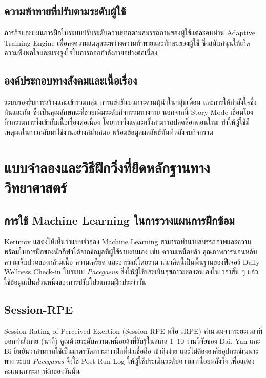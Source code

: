 \subsection{ความท้าทายที่ปรับตามระดับผู้ใช้}

ภารกิจและแผนการฝึกในระบบปรับระดับความยากตามสมรรถภาพของผู้ใช้แต่ละคนผ่าน Adaptive Training Engine เพื่อคงความสมดุลระหว่างความท้าทายและทักษะของผู้ใช้ ซึ่งสนับสนุนให้เกิดความพึงพอใจและแรงจูงใจในการออกกำลังกายอย่างต่อเนื่อง

\subsection{องค์ประกอบทางสังคมและเนื้อเรื่อง}

ระบบรองรับการสร้างและเข้าร่วมกลุ่ม การแข่งขันบนกระดานผู้นำในกลุ่มเพื่อน และการให้กำลังใจซึ่งกันและกัน ซึ่งเป็นคุณลักษณะที่ช่วยเพิ่มระดับกิจกรรมทางกาย \cite{tong2018} นอกจากนี้ Story Mode เชื่อมโยงกิจกรรมการวิ่งเข้ากับเนื้อเรื่องต่อเนื่อง โดยการวิ่งแต่ละครั้งสามารถปลดล็อกตอนใหม่ ทำให้ผู้ใช้มีเหตุผลในการกลับมาใช้งานอย่างสม่ำเสมอ พร้อมข้อมูลผลลัพธ์ทันทีหลังจบกิจกรรม

\section{แบบจำลองและวิธีฝึกวิ่งที่ยึดหลักฐานทางวิทยาศาสตร์}

\subsection{การใช้ Machine Learning ในการวางแผนการฝึกซ้อม}

Kerimov \cite{kerimov2025} แสดงให้เห็นว่าแบบจำลอง Machine Learning สามารถทำนายสมรรถภาพและความพร้อมในการฝึกของนักกีฬาได้จากข้อมูลที่ผู้ใช้รายงานเอง เช่น ความเหนื่อยล้า คุณภาพการนอนหลับ ความเจ็บปวดของกล้ามเนื้อ ความเครียด และอารมณ์โดยรวม แนวคิดนี้เป็นพื้นฐานของฟีเจอร์ Daily Wellness Check-in ในระบบ \textit{Pacegasus} ซึ่งให้ผู้ใช้ประเมินสุขภาวะของตนเองในเวลาสั้น ๆ แล้วใช้ข้อมูลเป็นส่วนหนึ่งของการปรับโปรแกรมฝึกประจำวัน

\subsection{Session-RPE}

Session Rating of Perceived Exertion (Session-RPE หรือ sRPE) คำนวณจากระยะเวลาที่ออกกำลังกาย (นาที) คูณด้วยระดับความเหนื่อยล้าที่รับรู้ในสเกล 1--10 งานวิจัยของ Dai, Yan และ Bi \cite{dai2025} ยืนยันว่าสามารถใช้เป็นมาตรวัดภาระการฝึกที่น่าเชื่อถือ เข้าถึงง่าย และไม่ต้องอาศัยอุปกรณ์เฉพาะทาง ระบบ \textit{Pacegasus} จึงใช้ Post-Run Log ให้ผู้ใช้ประเมินระดับความเหนื่อยหลังวิ่ง เพื่อแสดงคะแนนภาระการฝึกของวันนั้น

